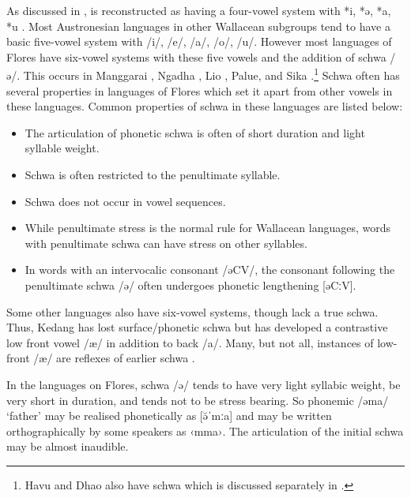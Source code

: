 As discussed in ,
 is reconstructed as having a four-vowel system with
*i, *ə, *a, *u \citep[173]{Blust2013}.
Most Austronesian languages in other Wallacean subgroups tend
to have a basic five-vowel system with /i/,
/e/, /a/, /o/, /u/.
However most languages of Flores have six-vowel systems
with these five vowels and the addition of schwa /ə/.
This occurs in Manggarai \citep{VerheijenGrimes1995},
Ngadha \citep{DjawanaiGrimes1995}, Lio \citep{Elias2018},
Palu{\Q}e, and Sika \citep{LewisGrimes1995}.\footnote{
		Havu and Dhao also have schwa which is discussed separately in .}
Schwa often has several properties in languages of Flores
which set it apart from other vowels in these languages.
Common properties of schwa in these languages are listed below:

\begin{itemize}
	\item The articulation of phonetic schwa is often of short duration and light syllable weight.
	\item Schwa is often restricted to the penultimate syllable.
	\item Schwa does not occur in vowel sequences.
	\item While penultimate stress is the normal rule for Wallacean languages,
				words with penultimate schwa can have stress on other syllables.
	\item In words with an intervocalic consonant /əCV/,
				the consonant following the penultimate schwa
				/ə/ often undergoes phonetic lengthening [əCːV].
\end{itemize}

Some other  languages also have six-vowel systems,
though lack a true schwa.
Thus, Kedang has lost surface/phonetic schwa but has developed
a contrastive low front vowel /æ/ in addition to back /a/.
Many, but not all, instances of low-front /æ/ are reflexes of
earlier schwa \citep[211ff]{Fricke2019}.

In the languages on Flores,
schwa /ə/ tends to have very light syllabic weight,
be very short in duration,
and tends not to be stress bearing.
So phonemic /əma/ ‘father’ may be realised phonetically as [ə̆ˈmːa]
and may be written orthographically by some speakers as ‹mma›.
The articulation of the initial schwa may be almost inaudible.

